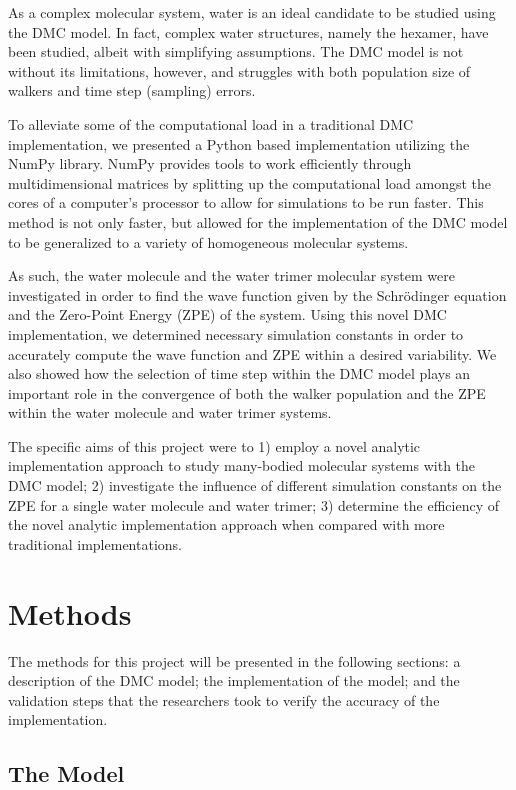 \documentclass[journal=jacsat,manuscript=article]{achemso}
\begin{document}
As a complex molecular system, water is an ideal candidate to be studied using the DMC model\cite{Reynolds1982}. In fact, complex water structures, namely the hexamer, have been studied\cite{Babin2013,Severson1999}, albeit with simplifying assumptions. The DMC model is not without its limitations, however, and struggles with both population size of walkers\cite{Mallory2015} and time step\cite{Urimgar1993} (sampling) errors. 

To alleviate some of the computational load in a traditional DMC implementation, we presented a Python based implementation utilizing the NumPy library. NumPy provides tools to work efficiently through multidimensional matrices by splitting up the computational load amongst the cores of a computer’s processor to allow for simulations to be run faster. This method is not only faster, but allowed for the implementation of the DMC model to be generalized to a variety of homogeneous molecular systems. 

As such, the water molecule and the water trimer molecular system were investigated in order to find the wave function given by the Schr\"odinger equation and the Zero-Point Energy\cite{Gregory1996} (ZPE) of the system. Using this novel DMC implementation, we determined necessary simulation constants in order to accurately compute the wave function and ZPE within a desired variability. We also showed how the selection of time step within the DMC model plays an important role in the convergence of both the walker population and the ZPE within the water molecule and water trimer systems. 
	
The specific aims of this project were to 1) employ a novel analytic implementation approach to study many-bodied molecular systems with the DMC model; 2) investigate the influence of different simulation constants on the ZPE for a single water molecule and water trimer; 3) determine the efficiency of the novel analytic implementation approach when compared with more traditional implementations. 


\section{Methods}

The methods for this project will be presented in the following sections: a description of the DMC model; the implementation of the model; and the validation steps that the researchers took to verify the accuracy of the implementation. 

\subsection{The Model}
\end{document}
